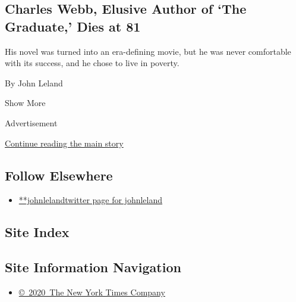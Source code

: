 \begin{enumerate}
  \hypertarget{charles-webb-elusive-author-of-the-graduate-dies-at-81}{%
  \subsection{Charles Webb, Elusive Author of `The Graduate,' Dies at
  81}\label{charles-webb-elusive-author-of-the-graduate-dies-at-81}}

  His novel was turned into an era-defining movie, but he was never
  comfortable with its success, and he chose to live in poverty.

  By John Leland
\end{enumerate}

Show More

Advertisement

\protect\hyperlink{after-mid2}{Continue reading the main story}

\hypertarget{follow-elsewhere}{%
\subsection{Follow Elsewhere}\label{follow-elsewhere}}

\begin{itemize}
\tightlist
\item
  \href{https://twitter.com/johnleland}{**johnlelandtwitter page for
  johnleland}
\end{itemize}

\hypertarget{site-index}{%
\subsection{Site Index}\label{site-index}}

\hypertarget{site-information-navigation}{%
\subsection{Site Information
Navigation}\label{site-information-navigation}}

\begin{itemize}
\tightlist
\item
  \href{https://help.nytimes.com/hc/en-us/articles/115014792127-Copyright-notice}{©~2020~The
  New York Times Company}
\end{itemize}

